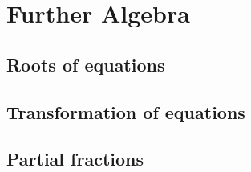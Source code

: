 \chapter{Further Algebra}

\section{Roots of equations}
\section{Transformation of equations}
\section{Partial fractions}